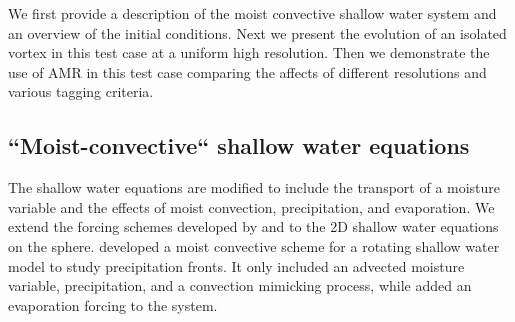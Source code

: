 \documentclass{ametsoc}
\begin{document}
  We first provide a description of the moist convective shallow water system 
  and an overview of the initial conditions. Next we present the evolution of an 
  isolated vortex in this test case at a uniform high resolution. Then we demonstrate
  the use of AMR in this test case comparing the affects of different resolutions and
  various tagging criteria.

  \subsection{``Moist-convective`` shallow water equations }
     The shallow water equations are modified to include the transport of a 
     moisture variable and the effects of moist convection, precipitation, and evaporation. 
     We extend the forcing schemes developed by \cite{bouchut2009fronts} and 
     \cite{lahaye2016understanding} to the 2D shallow water equations on the sphere. 
     \cite{bouchut2009fronts} developed a moist convective scheme 
     for a rotating shallow water model to study precipitation fronts. 
     It only included an advected moisture variable, precipitation, and 
     a convection mimicking process, while \cite{lahaye2016understanding} 
     added an evaporation forcing to the system.  
     
\end{document}
